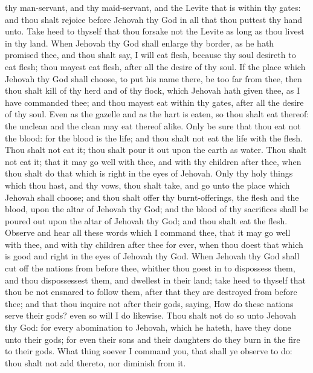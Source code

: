 thy man-servant, and thy maid-servant, and the Levite that is within thy gates: and thou shalt rejoice before Jehovah thy God in all that thou puttest thy hand unto. Take heed to thyself that thou forsake not the Levite as long as thou livest in thy land.  When Jehovah thy God shall enlarge thy border, as he hath promised thee, and thou shalt say, I will eat flesh, because thy soul desireth to eat flesh; thou mayest eat flesh, after all the desire of thy soul. If the place which Jehovah thy God shall choose, to put his name there, be too far from thee, then thou shalt kill of thy herd and of thy flock, which Jehovah hath given thee, as I have commanded thee; and thou mayest eat within thy gates, after all the desire of thy soul. Even as the gazelle and as the hart is eaten, so thou shalt eat thereof: the unclean and the clean may eat thereof alike. Only be sure that thou eat not the blood: for the blood is the life; and thou shalt not eat the life with the flesh. Thou shalt not eat it; thou shalt pour it out upon the earth as water. Thou shalt not eat it; that it may go well with thee, and with thy children after thee, when thou shalt do that which is right in the eyes of Jehovah. Only thy holy things which thou hast, and thy vows, thou shalt take, and go unto the place which Jehovah shall choose; and thou shalt offer thy burnt-offerings, the flesh and the blood, upon the altar of Jehovah thy God; and the blood of thy sacrifices shall be poured out upon the altar of Jehovah thy God; and thou shalt eat the flesh. Observe and hear all these words which I command thee, that it may go well with thee, and with thy children after thee for ever, when thou doest that which is good and right in the eyes of Jehovah thy God.  When Jehovah thy God shall cut off the nations from before thee, whither thou goest in to dispossess them, and thou dispossessest them, and dwellest in their land; take heed to thyself that thou be not ensnared to follow them, after that they are destroyed from before thee; and that thou inquire not after their gods, saying, How do these nations serve their gods? even so will I do likewise. Thou shalt not do so unto Jehovah thy God: for every abomination to Jehovah, which he hateth, have they done unto their gods; for even their sons and their daughters do they burn in the fire to their gods.  What thing soever I command you, that shall ye observe to do: thou shalt not add thereto, nor diminish from it. 


